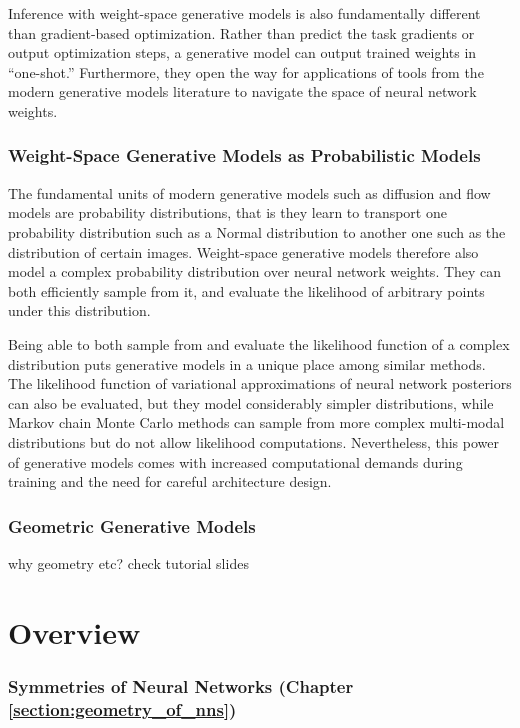 Inference with weight-space generative models is also fundamentally different than gradient-based optimization. Rather than predict the task gradients or output optimization steps, a generative model can output trained weights in ``one-shot.'' Furthermore, they open the way for applications of tools from the modern generative models literature to navigate the space of neural network weights. 

\subsubsection*{Weight-Space Generative Models as Probabilistic Models}

The fundamental units of modern generative models such as diffusion and flow models are probability distributions, that is they learn to transport one probability distribution such as a Normal distribution to another one such as the distribution of certain images. Weight-space generative models therefore also model a complex probability distribution over neural network weights. They can both efficiently sample from it, and evaluate the likelihood of arbitrary points under this distribution. 

Being able to both sample from and evaluate the likelihood function of a complex distribution puts generative models in a unique place among similar methods. The likelihood function of variational approximations of neural network posteriors can also be evaluated, but they model considerably simpler distributions, while Markov chain Monte Carlo methods can sample from more complex multi-modal distributions but do not allow likelihood computations. Nevertheless, this power of generative models comes with increased computational demands during training and the need for careful architecture design. 



{\color{red}
\subsubsection*{Geometric Generative Models}
why geometry etc? check tutorial slides}

\citep{kleinEquivariantFlowMatching2023a} \citep{bodnarAuroraFoundationModel2024}

\section{Overview}

\subsubsection{Symmetries of Neural Networks (Chapter \ref{section:geometry_of_nns})}

